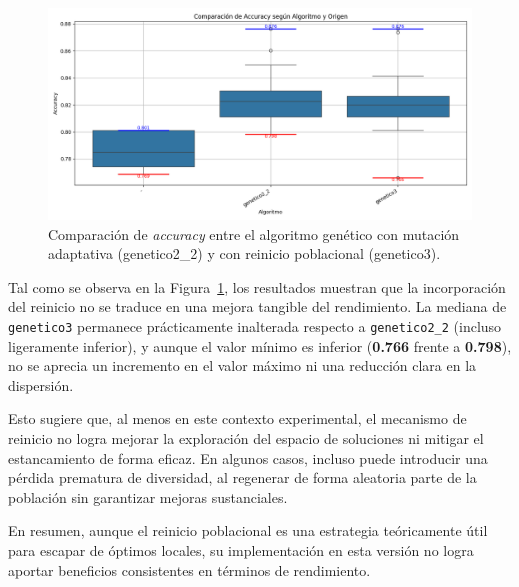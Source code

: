 \begin{figure}[htp]
    \centering
    \includegraphics[width=1\textwidth]{imagenes/evaluaciones/reinicio-poblacional}
    \caption{Comparación de \textit{accuracy} entre el algoritmo genético con mutación adaptativa (genetico2\_2) y con reinicio poblacional (genetico3).}
    \label{fig:reinicio_poblacional}
\end{figure}

Tal como se observa en la Figura~\ref{fig:reinicio_poblacional}, los resultados muestran que la incorporación del reinicio no se traduce en una mejora tangible del rendimiento.
La mediana de \texttt{genetico3} permanece prácticamente inalterada respecto a \texttt{genetico2\_2} (incluso ligeramente inferior),
y aunque el valor mínimo es inferior (\textbf{0.766} frente a \textbf{0.798}), no se aprecia un incremento en el valor máximo ni una reducción clara en la dispersión.

Esto sugiere que, al menos en este contexto experimental, el mecanismo de reinicio no logra mejorar la exploración del espacio de soluciones
ni mitigar el estancamiento de forma eficaz.
En algunos casos, incluso puede introducir una pérdida prematura de diversidad, al regenerar de forma aleatoria parte de la población sin garantizar mejoras sustanciales.

En resumen, aunque el reinicio poblacional es una estrategia teóricamente útil para escapar de óptimos locales,
su implementación en esta versión no logra aportar beneficios consistentes en términos de rendimiento.

